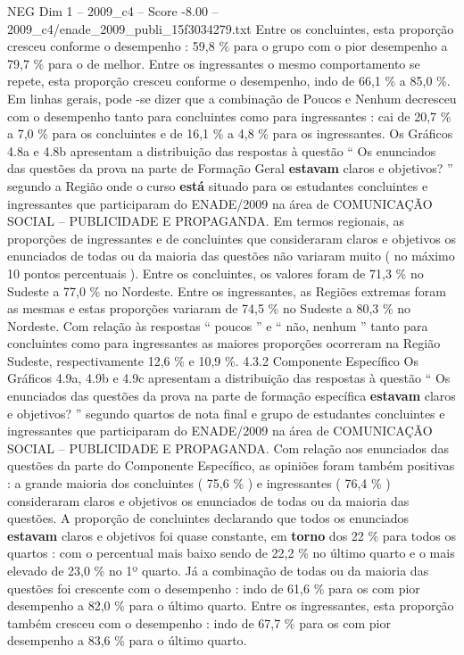\begin{textsample}{NEG Dim 1 – 2009\_c4 – Score -8.00 – 2009\_c4/enade\_2009\_publi\_15f3034279.txt}
Entre os concluintes, esta proporção cresceu conforme o desempenho : 59,8 \% para o grupo com o pior desempenho a 79,7 \% para o de melhor.
Entre os ingressantes o mesmo comportamento se repete, esta proporção cresceu conforme o desempenho, indo de 66,1 \% a 85,0 \%.
Em linhas gerais, pode -se dizer que a combinação de Poucos e Nenhum decresceu com o desempenho tanto para concluintes como para ingressantes : cai de 20,7 \% a 7,0 \% para os concluintes e de 16,1 \% a 4,8 \% para os ingressantes.
Os Gráficos 4.8a e 4.8b apresentam a distribuição das respostas à questão “ Os enunciados das questões da prova na parte de Formação Geral \textbf{estavam} claros e objetivos? ” segundo a Região onde o curso \textbf{está} situado para os estudantes concluintes e ingressantes que participaram do ENADE/2009 na área de COMUNICAÇÃO SOCIAL – PUBLICIDADE E PROPAGANDA.
Em termos regionais, as proporções de ingressantes e de concluintes que consideraram claros e objetivos os enunciados de todas ou da maioria das questões não variaram muito ( no máximo 10 pontos percentuais ).
Entre os concluintes, os valores foram de 71,3 \% no Sudeste a 77,0 \% no Nordeste.
Entre os ingressantes, as Regiões extremas foram as mesmas e estas proporções variaram de 74,5 \% no Sudeste a 80,3 \% no Nordeste.
Com relação às respostas “ poucos ” e “ não, nenhum ” tanto para concluintes como para ingressantes as maiores proporções ocorreram na Região Sudeste, respectivamente 12,6 \% e 10,9 \%. 4.3.2 Componente Específico Os Gráficos 4.9a, 4.9b e 4.9c apresentam a distribuição das respostas à questão “ Os enunciados das questões da prova na parte de formação específica \textbf{estavam} claros e objetivos? ” segundo quartos de nota final e grupo de estudantes concluintes e ingressantes que participaram do ENADE/2009 na área de COMUNICAÇÃO SOCIAL – PUBLICIDADE E PROPAGANDA.
Com relação aos enunciados das questões da parte do Componente Específico, as opiniões foram também positivas : a grande maioria dos concluintes ( 75,6 \% ) e ingressantes ( 76,4 \% ) consideraram claros e objetivos os enunciados de todas ou da maioria das questões.
A proporção de concluintes declarando que todos os enunciados \textbf{estavam} claros e objetivos foi quase constante, em \textbf{torno} dos 22 \% para todos os quartos : com o percentual mais baixo sendo de 22,2 \% no último quarto e o mais elevado de 23,0 \% no 1º quarto.
Já a combinação de todas ou da maioria das questões foi crescente com o desempenho : indo de 61,6 \% para os com pior desempenho a 82,0 \% para o último quarto.
Entre os ingressantes, esta proporção também cresceu com o desempenho : indo de 67,7 \% para os com pior desempenho a 83,6 \% para o último quarto.

\end{textsample}
